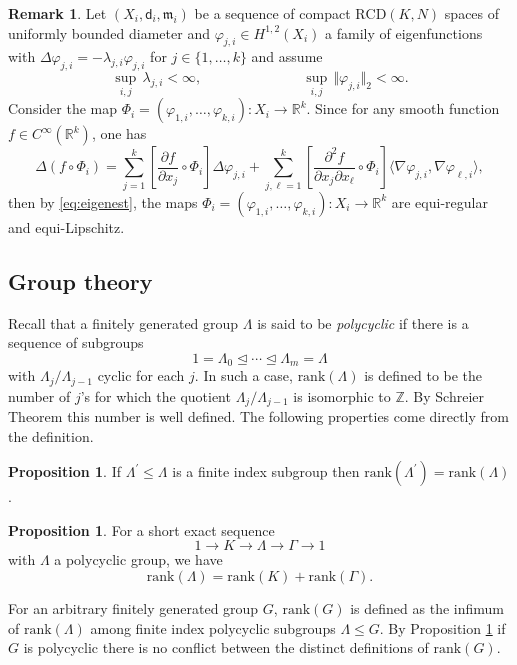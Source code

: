 \documentclass[12pt]{amsart}
\theoremstyle{definition}
\def\fnum{equation}
\newtheorem{remark}[\fnum]{Remark}
\newtheorem{proposition}[\fnum]{Proposition}
\numberwithin{equation}{section}
\newcommand{\rank}{{\text{rank}}}
\newcommand{\sobo}{H^{1,2}}
\newcommand{\rcd}{\text{RCD}}
\newcommand{\mm}{\mathfrak{m}}
\newcommand{\Z}{\mathbb{Z}}
\begin{document}
\begin{remark}\label{rem:equi-regular}
    Let $(X_i,\mathsf{d}_i ,\mm_i)$ be a sequence of compact $\rcd (K,N)$ spaces of uniformly bounded diameter and $\varphi _{j,i} \in \sobo (X_i)$ a family of eigenfunctions with $ \Delta \varphi_{j,i} =  - \lambda _{j,i} \varphi _{j,i} $ for $j \in \{ 1, \ldots , k \}$ and assume
    \[   \sup_{i,j} \, \lambda _{j,i} < \infty ,\hspace{3cm} \sup_{i,j} \,  \Vert \varphi_{j,i}  \Vert _2 < \infty .  \]
    Consider the map $\Phi_i = (\varphi_{1,i}, \ldots , \varphi_{k,i} ) : X_i \to \mathbb{R}^k $. Since for any smooth function $f \in C^{\infty} (\mathbb{R}^k)$, one has
    \[    \Delta (f \circ \Phi_i ) = \sum_{j = 1}^k  \left[ \frac{\partial f}{\partial x _j} \circ \Phi_i \right]  \Delta \varphi_{j,i} + \sum_{j,\ell = 1 }^k  \left[ \frac{\partial ^2 f}{ \partial x_j \partial x_{\ell} } \circ \Phi_i \right] \langle \nabla \varphi_{j,i} , \nabla \varphi_{\ell, i} \rangle  ,    \]
    then by  \eqref{eq:eigenest}, the maps $\Phi_i = (\varphi_{1,i}, \ldots, \varphi _{k,i} ) : X _ i \to \mathbb{R}^k$ are equi-regular and equi-Lipschitz. 
\end{remark}




\subsection{Group theory}\label{subsec:rank} Recall that a  finitely generated group $\Lambda$ is said to be \emph{polycyclic} if there is a sequence of subgroups
\[ 1 = \Lambda _0 \trianglelefteq  \cdots \trianglelefteq \Lambda _m = \Lambda    \]
with $\Lambda _ j / \Lambda _ {j-1} $ cyclic for each $j$. In such a case, $\rank (\Lambda )$ is defined to be the number of $j$'s for which the quotient $\Lambda _ j / \Lambda _{j-1}$ is isomorphic to $\Z$. By Schreier Theorem \cite{fraleigh} this number is well defined. The following properties come directly from the definition.
\begin{proposition} \label{pro:rank-properties-1}
If $\Lambda ^{\prime } \leq \Lambda $ is a finite index subgroup then $\rank (\Lambda ^{\prime } ) = \rank (\Lambda )$.
\end{proposition}
\begin{proposition} \label{pro:rank-properties-2}
For a short exact sequence 
\[ 1 \to K \to \Lambda \to \Gamma \to 1  \]
with $\Lambda$ a polycyclic group, we have
\[      \rank (\Lambda ) = \rank (K) + \rank (\Gamma ).  \]
\end{proposition}
For an arbitrary finitely generated group $G$,  $\rank (G)$ is defined as the infimum of $ \rank (\Lambda )$ among finite index polycyclic subgroups $\Lambda \leq G$. By Proposition \ref{pro:rank-properties-1}  if $G$ is polycyclic there is no conflict between the distinct definitions of $\rank ( G )$. 
 
\end{document}
